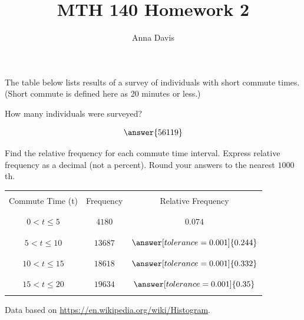 \documentclass{ximera}
\author{Anna Davis} \title{MTH 140 Homework 2}
\begin{document}
\begin{abstract}

\end{abstract}
\maketitle
\begin{problem}\label{prob:140hom2prob1}
The table below lists results of a survey of individuals with short commute times.  (Short commute is defined here as 20 minutes or less.)

How many individuals were surveyed?

$$\answer{56119}$$

Find the relative frequency for each commute time interval.  Express relative frequency as a decimal (not a percent).  Round your answers to the nearest $1000$th.
\begin{center}
\begin{tabular}{|c|c|c|}
 \hline
 &&   \\
 Commute Time (t)&Frequency& Relative Frequency \\
 &&   \\
  \hline
  &&  \\
 $0<t\leq 5$&$4180$&$0.074$ \\
  && \\
 \hline
  && \\
 $5<t\leq 10$&$13687$&$\answer[tolerance=0.001]{0.244}$ \\
  && \\
 \hline
  && \\
  $10<t\leq 15$&$18618$&$\answer[tolerance=0.001]{0.332}$  \\
  && \\
 \hline
 && \\
  $15<t\leq 20$&$19634$&$\answer[tolerance=0.001]{0.35}$  \\
  && \\
 \hline
 \end{tabular}
\end{center}    
Data based on \href{https://en.wikipedia.org/wiki/Histogram}{https://en.wikipedia.org/wiki/Histogram}.
\end{problem}
\end{document}
